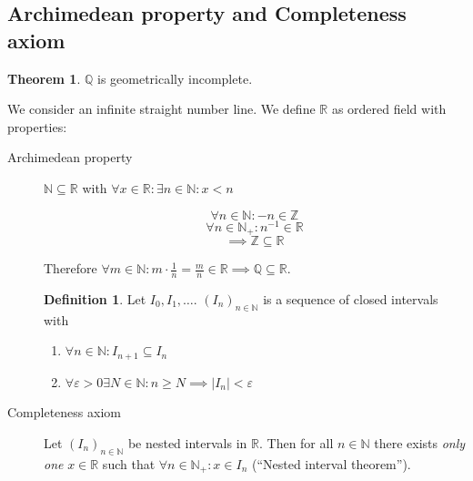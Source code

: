 \documentclass[a4paper,landscape,twocolumn]{article}
\theoremstyle{definition}
\newtheorem{theorem}{Theorem}
\newtheorem{defi}{Definition}
\newcommand\abs[1]{\left|#1\right|}
\begin{document}
\subsection{Archimedean property and Completeness axiom}
\begin{theorem}
  $\mathbb Q$ is geometrically incomplete.

  We consider an infinite straight number line.
  We define $\mathbb R$ as ordered field with properties:
  \begin{description}
    \item[Archimedean property]
      $\mathbb N \subseteq \mathbb R$ with $\forall x \in \mathbb R: \exists n \in \mathbb N: x < n$

      \[ \forall n \in \mathbb N: -n \in \mathbb Z \]
      \[ \forall n \in \mathbb N_+: n^{-1} \in \mathbb R \]
      \[ \implies \mathbb Z \subseteq \mathbb R \]

      Therefore $\forall m \in \mathbb N: m \cdot \frac1n = \frac mn \in \mathbb R
      \implies \mathbb Q \subseteq \mathbb R$.

      \begin{defi}
        Let $I_0, I_1, \dots$. $(I_n)_{n \in \mathbb N}$ is a sequence of closed intervals with
        \begin{enumerate}
          \item $\forall n \in \mathbb N: I_{n+1} \subseteq I_n$
          \item $\forall \varepsilon > 0 \exists N \in \mathbb N: n \geq N \implies \abs{I_n} < \varepsilon$
        \end{enumerate}
      \end{defi}

    \item[Completeness axiom]
      Let $(I_n)_{n \in \mathbb N}$ be nested intervals in $\mathbb R$.
      Then for all $n \in \mathbb N$ there exists \emph{only one} $x \in \mathbb R$ such that $\forall n \in \mathbb N_+: x \in I_n$
      (\enquote{Nested interval theorem}).


\end{description}
\end{theorem}
\end{document}
